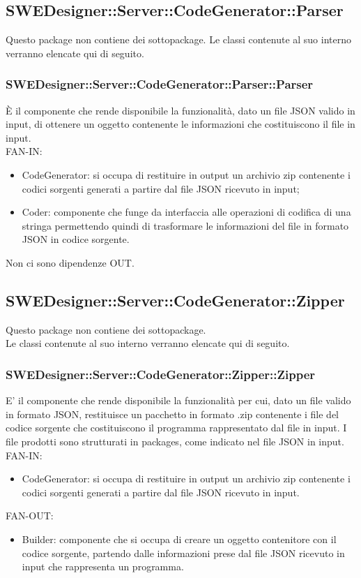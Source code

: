 \documentclass[../DefinizioneDiProdotto.tex]{subfiles}
\begin{document}
			\subsection{SWEDesigner::Server::CodeGenerator::Parser}
				Questo package non contiene dei sottopackage.
				Le classi contenute al suo interno verranno elencate qui di seguito.
				\subsubsection{SWEDesigner::Server::CodeGenerator::Parser::Parser}
				È il componente che rende disponibile la funzionalità, dato un file JSON valido in input, di ottenere un oggetto contenente le informazioni che costituiscono il file in input.\\
					FAN-IN:
					\begin{itemize}
						\item CodeGenerator: si occupa di restituire in output un archivio zip contenente i codici sorgenti generati a partire dal file JSON ricevuto in input;
						\item Coder: componente che funge da interfaccia alle operazioni di codifica di una stringa permettendo quindi di trasformare le informazioni del file in formato JSON in codice sorgente.
					\end{itemize}
					Non ci sono dipendenze OUT.

			\subsection{SWEDesigner::Server::CodeGenerator::Zipper}
				Questo package non contiene dei sottopackage.\\
				Le classi contenute al suo interno verranno elencate qui di seguito.
				\subsubsection{SWEDesigner::Server::CodeGenerator::Zipper::Zipper}
				E' il componente che rende disponibile la funzionalità per cui, dato un file valido in formato JSON, restituisce un pacchetto in formato .zip contenente i file del codice sorgente che costituiscono il programma rappresentato dal file in input. I file prodotti sono strutturati in packages, come indicato nel file JSON in input.\\
					FAN-IN:
					\begin{itemize}
						\item CodeGenerator: si occupa di restituire in output un archivio zip contenente i codici sorgenti generati a partire dal file JSON ricevuto in input.
					\end{itemize}
					FAN-OUT:
					\begin{itemize}
						\item Builder: componente che si occupa di creare un oggetto contenitore con il codice sorgente, partendo dalle informazioni prese dal file JSON ricevuto in input che rappresenta un programma.
					\end{itemize}
\end{document}
